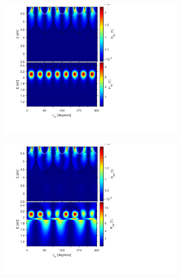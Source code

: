 \begin{figure}[h!]  %
    \begin{subfigure}{0.5\textwidth}
        \centering
        \includegraphics[width=\linewidth, trim=1.1cm  1.8cm 6.7cm 0cm, clip]{figures/ch4/S6/contour/S6_Rsp.png}
    \end{subfigure}
    \begin{subfigure}{0.5\textwidth}
        \centering
        \includegraphics[width=\linewidth, trim=1.1cm  1.8cm 6.7cm 0cm, clip]{figures/ch4/S6/contour/S6_Rps.png}
    \end{subfigure}
    

\end{figure}
